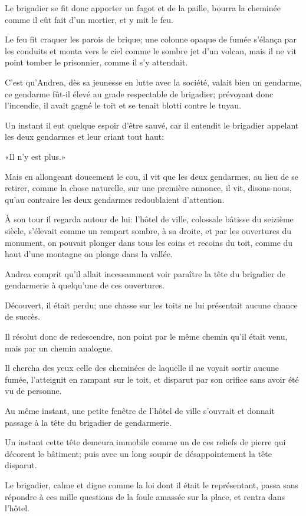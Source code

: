 Le brigadier se fit donc apporter un fagot et de la paille, bourra la cheminée comme il eût fait d'un mortier, et y mit le feu. 

Le feu fit craquer les parois de brique; une colonne opaque de fumée s'élança par les conduits et monta vers le ciel comme le sombre jet d'un volcan, mais il ne vit point tomber le prisonnier, comme il s'y attendait. 

C'est qu'Andrea, dès sa jeunesse en lutte avec la société, valait bien un gendarme, ce gendarme fût-il élevé au grade respectable de brigadier; prévoyant donc l'incendie, il avait gagné le toit et se tenait blotti contre le tuyau. 

Un instant il eut quelque espoir d'être sauvé, car il entendit le brigadier appelant les deux gendarmes et leur criant tout haut: 

«Il n'y est plus.» 

Mais en allongeant doucement le cou, il vit que les deux gendarmes, au lieu de se retirer, comme la chose naturelle, sur une première annonce, il vit, disons-nous, qu'au contraire les deux gendarmes redoublaient d'attention. 

À son tour il regarda autour de lui: l'hôtel de ville, colossale bâtisse du seizième siècle, s'élevait comme un rempart sombre, à sa droite, et par les ouvertures du monument, on pouvait plonger dans tous les coins et recoins du toit, comme du haut d'une montagne on plonge dans la vallée. 

Andrea comprit qu'il allait incessamment voir paraître la tête du brigadier de gendarmerie à quelqu'une de ces ouvertures. 

Découvert, il était perdu; une chasse sur les toits ne lui présentait aucune chance de succès. 

Il résolut donc de redescendre, non point par le même chemin qu'il était venu, mais par un chemin analogue. 

Il chercha des yeux celle des cheminées de laquelle il ne voyait sortir aucune fumée, l'atteignit en rampant sur le toit, et disparut par son orifice sans avoir été vu de personne. 

Au même instant, une petite fenêtre de l'hôtel de ville s'ouvrait et donnait passage à la tête du brigadier de gendarmerie. 

Un instant cette tête demeura immobile comme un de ces reliefs de pierre qui décorent le bâtiment; puis avec un long soupir de désappointement la tête disparut. 

Le brigadier, calme et digne comme la loi dont il était le représentant, passa sans répondre à ces mille questions de la foule amassée sur la place, et rentra dans l'hôtel. 

